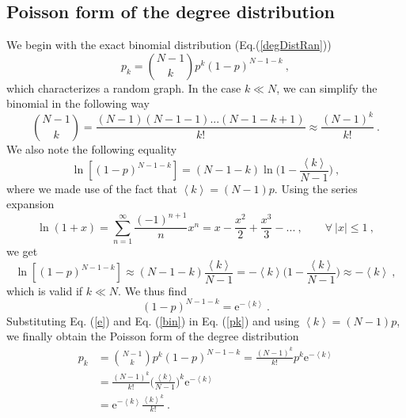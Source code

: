 \documentclass[11 pt , letterpaper , twoside , openright]{book}
\begin{document}
\subsection{Poisson form of the degree distribution}\label{poiss}
We begin with the exact binomial distribution (Eq.(\ref{degDistRan}))
\begin{equation}\label{pk}
	p_k = \binom{N-1}{k}p^k (1-p)^{N-1-k} \ ,
\end{equation}
which characterizes a random graph. In the case $k \ll N$, we can simplify the binomial in the following way \cite{Albert2014}
\begin{equation}\label{bin}
	\binom{N-1}{k} = \frac{(N-1)(N-1-1)...(N-1-k+1)}{k!} \approx \frac{(N-1)^k}{k!} \ .
\end{equation}
We also note the following equality \cite{Albert2014}
\begin{equation}
	\ln[(1-p)^{N-1-k}] = (N-1-k)\ln\bigg(1 - \frac{\left<k\right>}{N-1} \bigg) \ ,
\end{equation}
where we made use of the fact that $\left<k\right> = (N-1)p$. Using the series expansion \cite{Albert2014}
\begin{equation}
	\ln(1+x) = \sum_{n=1}^{\infty}\frac{(-1)^{n+1}}{n}x^n = x - \frac{x^2}{2} + \frac{x^3}{3} - ... \ ,  \qquad \forall \ |x| \leqslant 1 \ ,
\end{equation}
we get \cite{Albert2014}
\begin{equation}
	\ln[(1-p)^{N-1-k}] \approx (N-1-k) \frac{\left<k\right>}{N-1} = - \left<k\right>\bigg(1 - \frac{\left<k\right>}{N-1} \bigg) \approx - \left<k\right> \ ,
\end{equation}
which is valid if $k \ll N$. We thus find \cite{Albert2014}
\begin{equation}\label{e}
	(1-p)^{N-1-k} = \mathrm{e}^{-\left<k\right>} \ .
\end{equation}
Substituting Eq. (\ref{e}) and Eq. (\ref{bin}) in Eq. (\ref{pk}) and using $\left<k\right> = (N-1)p$, we finally obtain the Poisson form of the degree distribution \cite{Albert2014}
\begin{equation}
\begin{split}
	p_k &= \binom{N-1}{k}p^k (1-p)^{N-1-k} = \frac{(N-1)^k}{k!} p^k \mathrm{e}^{-\left<k\right>} \\
&= \frac{(N-1)^k}{k!} \bigg(\frac{\left<k\right>}{N-1} \bigg)^k \mathrm{e}^{-\left<k\right>}\\
&= \mathrm{e}^{-\left<k\right>}\frac{\left<k\right>^k}{k!} \ .
\end{split}
\end{equation}
\end{document}
